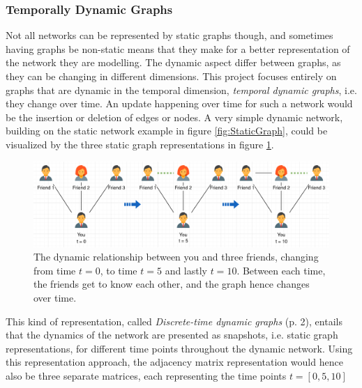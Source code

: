\subsubsection{Temporally Dynamic Graphs}
\label{sec:Method:Graphs:DynamicGraphs}
Not all networks can be represented by static graphs though, and sometimes having graphs be non-static means that they make for a better representation of the network they are modelling. 
The dynamic aspect differ between graphs, as they can be changing in different dimensions. 
This project focuses entirely on graphs that are dynamic in the temporal dimension, \textit{temporal dynamic graphs}, i.e. they change over time. 
An update happening over time for such a network would be the insertion or deletion of edges or nodes.
A very simple dynamic network, building on the static network example in figure \ref{fig:StaticGraph}, could be visualized by the three static graph representations in figure \ref{fig:DynamicGraph}.
\begin{figure}[H]
    \centering
    \includegraphics[width=\textwidth]{0_images/dynamic_graph2.png}
    \caption{The dynamic relationship between you and three friends, changing from time $t=0$, to time $t=5$ and lastly $t=10$. Between each time, the friends get to know each other, and the graph hence changes over time.}
    \label{fig:DynamicGraph}
\end{figure}
\noindent
This kind of representation, called \textit{Discrete-time dynamic graphs} \cite{Rossi2020TEMPORALGRAPHS} (p. 2), entails that the dynamics of the network are presented as snapshots, i.e. static graph representations, for different time points throughout the dynamic network.
Using this representation approach, the adjacency matrix representation would hence also be three separate matrices, each representing the time points $t= [0,5,10]$ 

